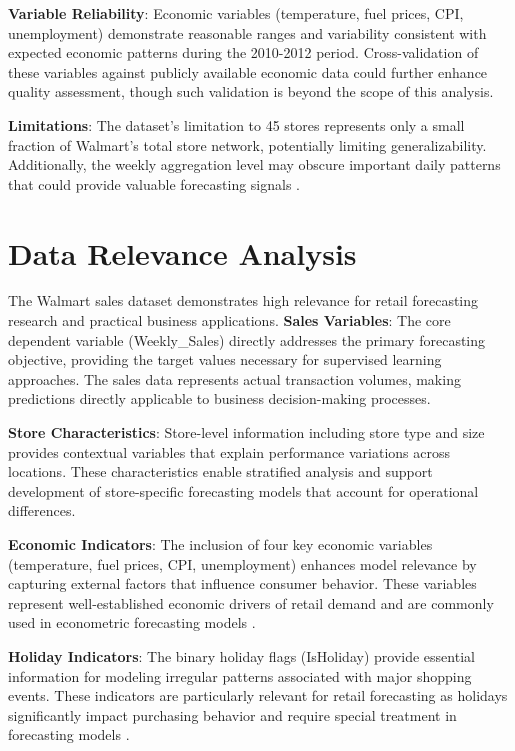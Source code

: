 \textbf{Variable Reliability}: Economic variables (temperature, fuel prices, CPI, unemployment) demonstrate reasonable ranges and variability consistent with expected economic patterns during the 2010-2012 period. Cross-validation of these variables against publicly available economic data could further enhance quality assessment, though such validation is beyond the scope of this analysis.

\textbf{Limitations}: The dataset's limitation to 45 stores represents only a small fraction of Walmart's total store network, potentially limiting generalizability. Additionally, the weekly aggregation level may obscure important daily patterns that could provide valuable forecasting signals \cite{McElroy:2018}.

\section{Data Relevance Analysis}

The Walmart sales dataset demonstrates high relevance for retail forecasting research and practical business applications. \textbf{Sales Variables}: The core dependent variable (Weekly\_Sales) directly addresses the primary forecasting objective, providing the target values necessary for supervised learning approaches. The sales data represents actual transaction volumes, making predictions directly applicable to business decision-making processes.

\textbf{Store Characteristics}: Store-level information including store type and size provides contextual variables that explain performance variations across locations. These characteristics enable stratified analysis and support development of store-specific forecasting models that account for operational differences.

\textbf{Economic Indicators}: The inclusion of four key economic variables (temperature, fuel prices, CPI, unemployment) enhances model relevance by capturing external factors that influence consumer behavior. These variables represent well-established economic drivers of retail demand and are commonly used in econometric forecasting models \cite{Zhang:2021}.

\textbf{Holiday Indicators}: The binary holiday flags (IsHoliday) provide essential information for modeling irregular patterns associated with major shopping events. These indicators are particularly relevant for retail forecasting as holidays significantly impact purchasing behavior and require special treatment in forecasting models \cite{Loyal:2017}.

